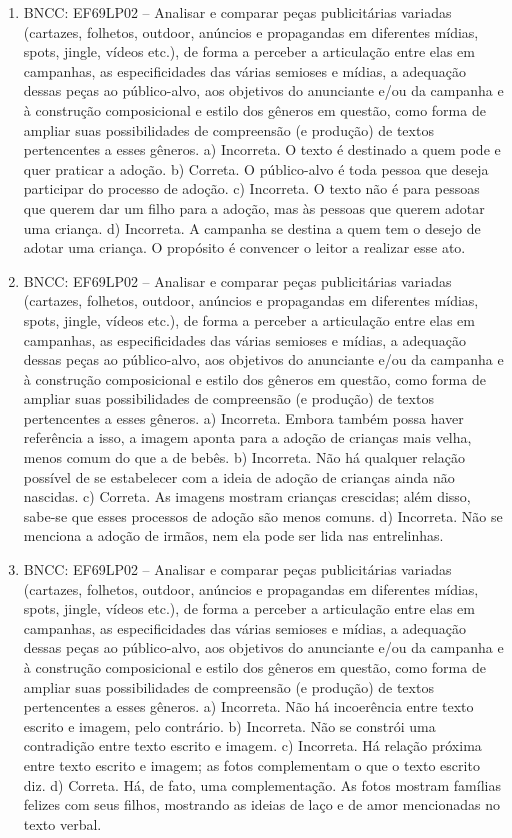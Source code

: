 
\begin{enumerate}
\item
BNCC: EF69LP02 -- Analisar e comparar peças publicitárias variadas
(cartazes, folhetos, outdoor, anúncios e propagandas em diferentes
mídias, spots, jingle, vídeos etc.), de forma a perceber a articulação
entre elas em campanhas, as especificidades das várias semioses e
mídias, a adequação dessas peças ao público-alvo, aos objetivos do
anunciante e/ou da campanha e à construção composicional e estilo dos
gêneros em questão, como forma de ampliar suas possibilidades de
compreensão (e produção) de textos pertencentes a esses gêneros. a) Incorreta. O texto é destinado a quem pode e quer praticar a adoção. b) Correta. O público-alvo é toda pessoa que deseja participar do processo de adoção. c) Incorreta. O texto não é para pessoas que querem dar um filho para a adoção, mas às pessoas que querem adotar uma criança. d) Incorreta. A campanha se destina a quem tem o desejo de adotar uma
criança. O propósito é convencer o leitor a realizar esse ato.

\item
BNCC: EF69LP02 -- Analisar e comparar peças publicitárias variadas
(cartazes, folhetos, outdoor, anúncios e propagandas em diferentes
mídias, spots, jingle, vídeos etc.), de forma a perceber a articulação
entre elas em campanhas, as especificidades das várias semioses e
mídias, a adequação dessas peças ao público-alvo, aos objetivos do
anunciante e/ou da campanha e à construção composicional e estilo dos
gêneros em questão, como forma de ampliar suas possibilidades de
compreensão (e produção) de textos pertencentes a esses gêneros. a) Incorreta. Embora também possa haver referência a isso, a imagem aponta para a adoção de crianças mais velha, menos comum do que a de bebês. b) Incorreta. Não há qualquer relação possível de se estabelecer com a ideia de adoção de crianças ainda não nascidas. c) Correta. As imagens mostram crianças crescidas; além disso, sabe-se que esses processos de adoção são menos comuns. d) Incorreta. Não se menciona a adoção de irmãos, nem ela pode ser lida nas entrelinhas.

\item
BNCC: EF69LP02 -- Analisar e comparar peças publicitárias variadas
(cartazes, folhetos, outdoor, anúncios e propagandas em diferentes
mídias, spots, jingle, vídeos etc.), de forma a perceber a articulação
entre elas em campanhas, as especificidades das várias semioses e
mídias, a adequação dessas peças ao público-alvo, aos objetivos do
anunciante e/ou da campanha e à construção composicional e estilo dos
gêneros em questão, como forma de ampliar suas possibilidades de
compreensão (e produção) de textos pertencentes a esses gêneros. a) Incorreta. Não há incoerência entre texto escrito e imagem, pelo contrário. b) Incorreta. Não se constrói uma contradição entre texto escrito e imagem. c) Incorreta. Há relação próxima entre texto escrito e imagem; as fotos complementam o que o texto escrito diz. d) Correta. Há, de fato, uma complementação. As fotos mostram famílias felizes com seus filhos, mostrando as ideias de laço e de amor mencionadas no texto verbal.


\end{enumerate}
